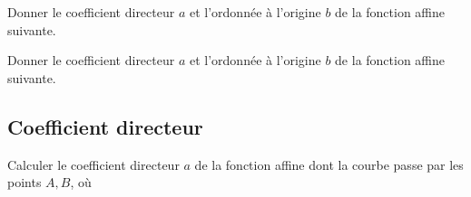 \begin{frame}{2}	
	Donner le coefficient directeur $a$ et l'ordonnée à l'origine $b$ de la fonction affine suivante.
	\boxAB{
		\[ f(x) = 2+x \]
	}{
		\[ g(x) = 4 - x \]
	}
\end{frame}

\begin{frame}{3}	
	Donner le coefficient directeur $a$ et l'ordonnée à l'origine $b$ de la fonction affine suivante.
	\boxAB{
		\[ F(x) = 3 \]
	}{
		\[ G(x) = 2x \]
	}
\end{frame}

\subsection{Coefficient directeur}

\begin{frame}{4}

	Calculer le coefficient directeur $a$ de la fonction affine dont la courbe passe par les points $A, B$, où
	
\end{frame}


